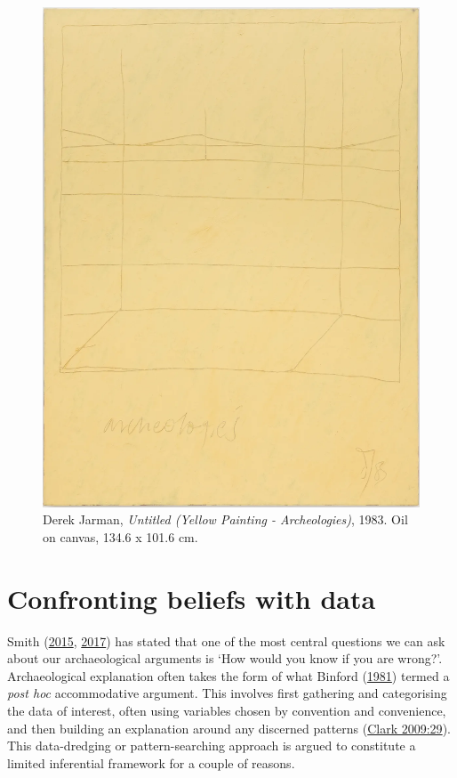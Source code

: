 \documentclass[
  12pt,
  a4paper,
  oneside]{book}
\begin{document}
\begin{figure}

{\centering \includegraphics[width=1\linewidth]{figures/jarman} 

}

\caption{Derek Jarman, \textit{Untitled (Yellow Painting - Archeologies)}, 1983. Oil on canvas, 134.6 x 101.6 cm.}\label{fig:jarman}
\end{figure}

\hypertarget{confronting-beliefs-with-data}{%
\section{Confronting beliefs with data}\label{confronting-beliefs-with-data}}

Smith (\protect\hyperlink{ref-smith2015}{2015}, \protect\hyperlink{ref-smith2017}{2017}) has stated that one of the most central questions we can ask about our archaeological arguments is `How would you know if you are wrong?'. Archaeological explanation often takes the form of what Binford (\protect\hyperlink{ref-binford1981}{1981}) termed a \emph{post hoc} accommodative argument. This involves first gathering and categorising the data of interest, often using variables chosen by convention and convenience, and then building an explanation around any discerned patterns (\protect\hyperlink{ref-clark2009}{Clark 2009:29}). This data-dredging or pattern-searching approach is argued to constitute a limited inferential framework for a couple of reasons.
\end{document}
